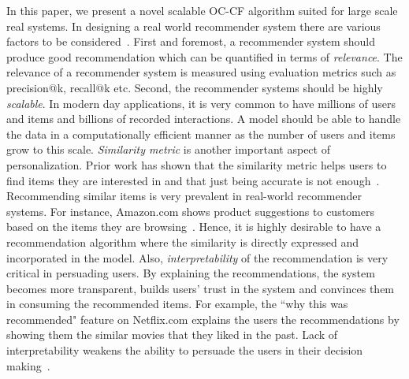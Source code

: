In this paper, we present a novel scalable OC-CF algorithm suited for large scale real systems. 
In designing a real world recommender system there are various factors to be 
considered~\citep{adomavicius2005toward, ricci2011introduction}. First and foremost, a recommender system should  produce good recommendation which can be quantified in terms of \textsl{relevance}. The relevance of a recommender system is measured using evaluation metrics such as \textsf{precision@k}, \textsf{recall@k} etc. Second, the recommender systems should be highly \textsl{scalable}. In modern day applications, it is very common to have millions of users and items and billions of recorded interactions. A model should be able to handle the data in a computationally efficient manner as the number of users and items grow to this scale. \textsl{Similarity metric} is another important aspect of personalization. Prior work has shown that the similarity metric helps users to find items they are interested in and that just being accurate is not enough~\citep{mcnee2006being}.  Recommending similar items is very prevalent in  real-world recommender systems. For instance, Amazon.com shows product suggestions to customers based on the items they are browsing~\citep{linden2003amazon}. Hence, it is highly desirable to have a recommendation algorithm where the similarity is directly expressed and incorporated in the model. Also, \textsl{interpretability} of the recommendation is very critical in persuading users. By explaining the recommendations, the system becomes more transparent, builds users' trust in the system and convinces them in consuming the recommended items. For example, the ``why this was recommended" feature on Netflix.com explains the users the recommendations by showing them the similar movies that they liked in the past. Lack of interpretability weakens the ability to persuade the users in their decision making~\citep{explainabiltyVIG2009}.

